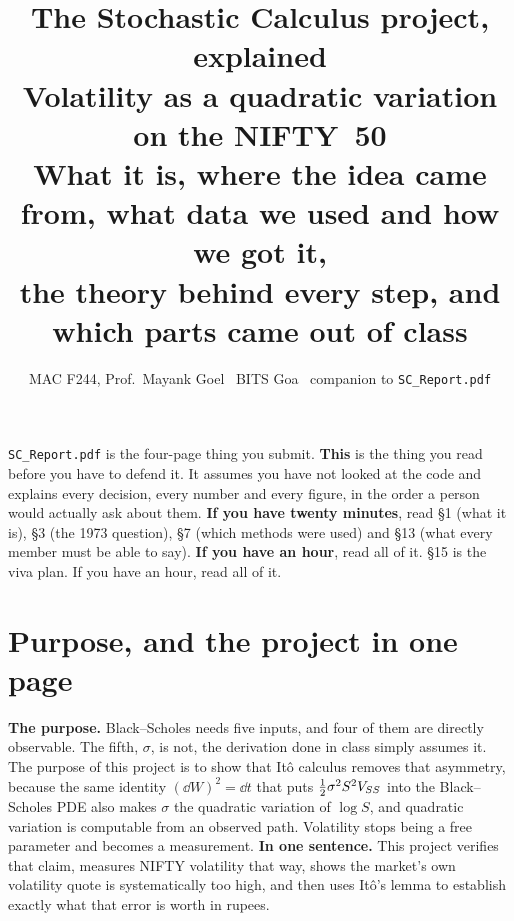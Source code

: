 \documentclass[11pt,a4paper]{article}
\title{\vspace{-1.5cm}\textbf{The Stochastic Calculus project, explained}\\
\large Volatility as a quadratic variation on the NIFTY~50\\[4pt]
\normalsize What it is, where the idea came from, what data we used and how we got it,\\
the theory behind every step, and which parts came out of class}
\author{MAC F244, Prof.\ Mayank Goel \textbullet\ BITS Goa \textbullet\ companion to \texttt{SC\_Report.pdf}}
\date{}
\begin{document}
\maketitle
\vspace{-0.6cm}

\begin{keybox}
\texttt{SC\_Report.pdf} is the four-page thing you submit. \textbf{This} is the thing you read
before you have to defend it. It assumes you have not looked at the code and explains every
decision, every number and every figure, in the order a person would actually ask about them.
\smallskip
\textbf{If you have twenty minutes}, read \S1 (what it is), \S3 (the 1973 question),
\S7 (which methods were used) and \S13 (what every member must be able to say).
\textbf{If you have an hour}, read all of it. \S15 is the viva plan. If you have an hour, read all of it.
\end{keybox}

\tableofcontents

\section{Purpose, and the project in one page}

\textbf{The purpose.} Black--Scholes needs five inputs, and four of them are directly
observable. The fifth, $\sigma$, is not, the derivation done in class simply assumes it. The
purpose of this project is to show that It\^o calculus removes that asymmetry, because the same
identity $(\dd W)^2=\dd t$ that puts $\tfrac{1}{2}\sigma^2S^2V_{SS}$ into the Black--Scholes PDE also
makes $\sigma$ the quadratic variation of $\log S$, and quadratic variation is computable
from an observed path. Volatility stops being a free parameter and becomes a measurement.
\smallskip
\textbf{In one sentence.} This project verifies that claim, measures NIFTY volatility that way,
shows the market's own volatility quote is systematically too high, and then uses It\^o's lemma
to establish exactly what that error is worth in rupees.
\end{document}
